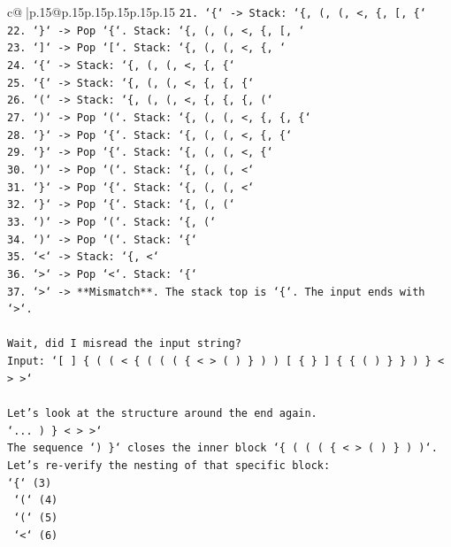 \documentclass{article}
\begin{document}
{\begin{supertabular}{c@{$\;$}|p{.15\linewidth}@{}p{.15\linewidth}p{.15\linewidth}p{.15\linewidth}p{.15\linewidth}p{.15\linewidth}}
{{{\texttt{21. `\{` {-}> Stack: `\{, (, (, <, \{, {[}, \{`} \\
\texttt{22. `\}` {-}> Pop `\{`. Stack: `\{, (, (, <, \{, {[}, `} \\
\texttt{23. `{]}` {-}> Pop `{[}`. Stack: `\{, (, (, <, \{, `} \\
\texttt{24. `\{` {-}> Stack: `\{, (, (, <, \{, \{`} \\
\texttt{25. `\{` {-}> Stack: `\{, (, (, <, \{, \{, \{`} \\
\texttt{26. `(` {-}> Stack: `\{, (, (, <, \{, \{, \{, (`} \\
\texttt{27. `)` {-}> Pop `(`. Stack: `\{, (, (, <, \{, \{, \{`} \\
\texttt{28. `\}` {-}> Pop `\{`. Stack: `\{, (, (, <, \{, \{`} \\
\texttt{29. `\}` {-}> Pop `\{`. Stack: `\{, (, (, <, \{`} \\
\texttt{30. `)` {-}> Pop `(`. Stack: `\{, (, (, <`} \\
\texttt{31. `\}` {-}> Pop `\{`. Stack: `\{, (, (, <`} \\
\texttt{32. `\}` {-}> Pop `\{`. Stack: `\{, (, (`} \\
\texttt{33. `)` {-}> Pop `(`. Stack: `\{, (`} \\
\texttt{34. `)` {-}> Pop `(`. Stack: `\{`} \\
\texttt{35. `<` {-}> Stack: `\{, <`} \\
\texttt{36. `>` {-}> Pop `<`. Stack: `\{`} \\
\texttt{37. `>` {-}> **Mismatch**. The stack top is `\{`. The input ends with `>`.} \\
\\ 
\texttt{Wait, did I misread the input string?} \\
\texttt{Input: `{[} {]} \{ ( ( < \{ ( ( ( \{ < > ( ) \} ) ) {[} \{ \} {]} \{ \{ ( ) \} \} ) \} < > >`} \\
\\ 
\texttt{Let's look at the structure around the end again.} \\
\texttt{`... ) \} < > >`} \\
\texttt{The sequence `) \}` closes the inner block `\{ ( ( ( \{ < > ( ) \} ) )`.} \\
\texttt{Let's re{-}verify the nesting of that specific block:} \\
\texttt{`\{` (3)} \\
\texttt{  `(` (4)} \\
\texttt{    `(` (5)} \\
\texttt{      `<` (6)} \\
}}}
\end{supertabular}}
\end{document}
